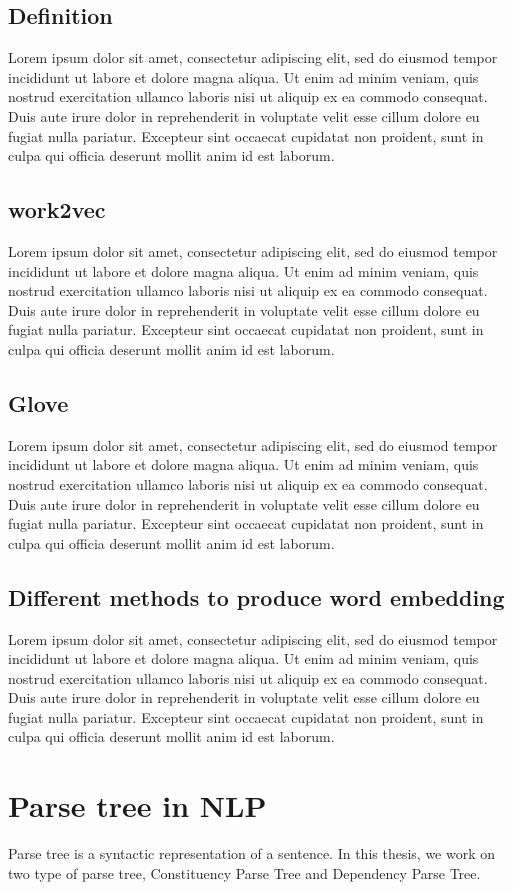 \subsection{Definition}
Lorem ipsum dolor sit amet, consectetur adipiscing elit, sed do eiusmod tempor incididunt ut labore et dolore magna aliqua. Ut enim ad minim veniam, quis nostrud exercitation ullamco laboris nisi ut aliquip ex ea commodo consequat. Duis aute irure dolor in reprehenderit in voluptate velit esse cillum dolore eu fugiat nulla pariatur. Excepteur sint occaecat cupidatat non proident, sunt in culpa qui officia deserunt mollit anim id est laborum.
\subsection{work2vec}
Lorem ipsum dolor sit amet, consectetur adipiscing elit, sed do eiusmod tempor incididunt ut labore et dolore magna aliqua. Ut enim ad minim veniam, quis nostrud exercitation ullamco laboris nisi ut aliquip ex ea commodo consequat. Duis aute irure dolor in reprehenderit in voluptate velit esse cillum dolore eu fugiat nulla pariatur. Excepteur sint occaecat cupidatat non proident, sunt in culpa qui officia deserunt mollit anim id est laborum.
\subsection{Glove}
Lorem ipsum dolor sit amet, consectetur adipiscing elit, sed do eiusmod tempor incididunt ut labore et dolore magna aliqua. Ut enim ad minim veniam, quis nostrud exercitation ullamco laboris nisi ut aliquip ex ea commodo consequat. Duis aute irure dolor in reprehenderit in voluptate velit esse cillum dolore eu fugiat nulla pariatur. Excepteur sint occaecat cupidatat non proident, sunt in culpa qui officia deserunt mollit anim id est laborum.
\subsection{Different methods to produce word embedding}
Lorem ipsum dolor sit amet, consectetur adipiscing elit, sed do eiusmod tempor incididunt ut labore et dolore magna aliqua. Ut enim ad minim veniam, quis nostrud exercitation ullamco laboris nisi ut aliquip ex ea commodo consequat. Duis aute irure dolor in reprehenderit in voluptate velit esse cillum dolore eu fugiat nulla pariatur. Excepteur sint occaecat cupidatat non proident, sunt in culpa qui officia deserunt mollit anim id est laborum.
\section{Parse tree in NLP}
Parse tree is a syntactic representation of a sentence. In this thesis, we work on two type of parse tree, Constituency Parse Tree and Dependency Parse Tree.
